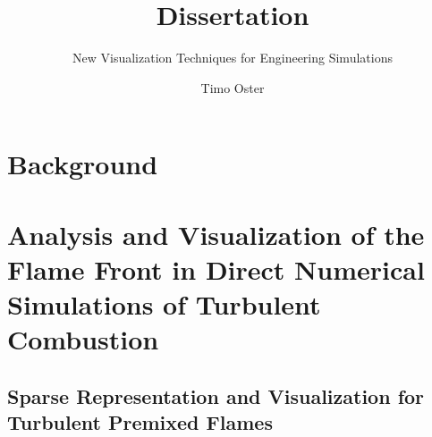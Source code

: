 \documentclass[BCOR=15mm, DIV=8]{scrbook}
\title{ Dissertation }
\subtitle{ New Visualization Techniques for Engineering Simulations }
\author{ Timo Oster }
\begin{document}

\frontmatter

\maketitle

\cleardoublepage
{}
\tableofcontents

\mainmatter



\part{Background} %
\label{part:background}






\part%
        {Analysis and Visualization of the Flame Front
         in Direct Numerical Simulations of Turbulent Combustion} %
\label{part:flame_vis}

\chapter[Sparse Representation for Turbulent Premixed Flames]
        {Sparse Representation and Visualization for Turbulent Premixed Flames} %
\label{cha:sparse_representation}
%
\tikzset{external/export=false}
\tikzset{external/export=true}
%







%
\end{document}
